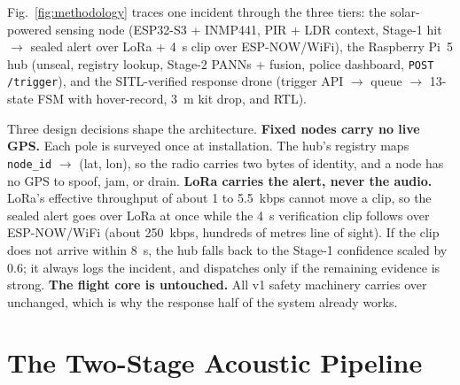 \documentclass[conference]{IEEEtran}
\begin{document}
Fig.~\ref{fig:methodology} traces one incident through the three
tiers: the solar-powered sensing node (ESP32-S3 + INMP441, PIR + LDR
context, Stage-1 hit $\rightarrow$ sealed alert over LoRa + 4~s clip
over ESP-NOW/WiFi), the Raspberry Pi~5 hub (unseal, registry lookup,
Stage-2 PANNs + fusion, police dashboard, \texttt{POST /trigger}), and
the SITL-verified response drone (trigger API $\rightarrow$ queue
$\rightarrow$ 13-state FSM with hover-record, 3~m kit drop, and RTL).

Three design decisions shape the architecture. \textbf{Fixed nodes
carry no live GPS.} Each pole is surveyed once at installation. The
hub's registry maps \texttt{node\_id} $\rightarrow$ (lat, lon), so the
radio carries two bytes of identity, and a node has no GPS to spoof,
jam, or drain. \textbf{LoRa carries the alert, never the audio.}
LoRa's effective throughput of about 1 to 5.5~kbps cannot move a clip,
so the sealed alert goes over LoRa at once while the 4~s verification
clip follows over ESP-NOW/WiFi (about 250~kbps, hundreds of metres
line of sight). If the clip does not arrive within 8~s, the hub falls
back to the Stage-1 confidence scaled by 0.6; it always logs the
incident, and dispatches only if the remaining evidence is strong.
\textbf{The flight core is untouched.} All v1 safety machinery carries
over unchanged, which is why the response half of the system already
works.

\section{The Two-Stage Acoustic Pipeline}
\label{sec:pipeline}
\end{document}
